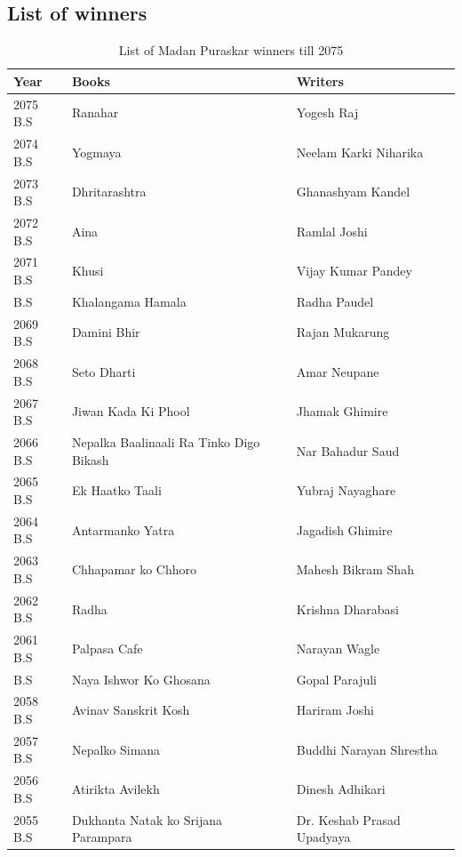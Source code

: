 \documentclass[
]{book}
\begin{document}
\hypertarget{list-of-winners}{%
\subsection{List of winners}\label{list-of-winners}}

\begingroup\fontsize{8}{10}\selectfont

\begin{longtable}[t]{l>{\raggedright\arraybackslash}p{14em}>{\raggedright\arraybackslash}p{24em}}
\caption{\label{tab:winners-list}List of Madan Puraskar winners till 2075}\\
\toprule
Year & Books & Writers\\
\midrule
\rowcolor{gray!6}  2075 B.S & Ranahar & Yogesh Raj\\
2074 B.S & Yogmaya & Neelam Karki Niharika\\
\rowcolor{gray!6}  2073 B.S & Dhritarashtra & Ghanashyam Kandel\\
2072 B.S & Aina & Ramlal Joshi\\
\rowcolor{gray!6}  2071 B.S & Khusi & Vijay Kumar Pandey\\
\addlinespace
2070 B.S & Khalangama Hamala & Radha Paudel\\
\rowcolor{gray!6}  2069 B.S & Damini Bhir & Rajan Mukarung\\
2068 B.S & Seto Dharti & Amar Neupane\\
\rowcolor{gray!6}  2067 B.S & Jiwan Kada Ki Phool & Jhamak Ghimire\\
2066 B.S & Nepalka Baalinaali Ra Tinko Digo Bikash & Nar Bahadur Saud\\
\addlinespace
\rowcolor{gray!6}  2065 B.S & Ek Haatko Taali & Yubraj Nayaghare\\
2064 B.S & Antarmanko Yatra & Jagadish Ghimire\\
\rowcolor{gray!6}  2063 B.S & Chhapamar ko Chhoro & Mahesh Bikram Shah\\
2062 B.S & Radha & Krishna Dharabasi\\
\rowcolor{gray!6}  2061 B.S & Palpasa Cafe & Narayan Wagle\\
\addlinespace
2060 B.S & Naya Ishwor Ko Ghosana & Gopal Parajuli\\
\rowcolor{gray!6}  2058 B.S & Avinav Sanskrit Kosh & Hariram Joshi\\
2057 B.S & Nepalko Simana & Buddhi Narayan Shrestha\\
\rowcolor{gray!6}  2056 B.S & Atirikta Avilekh & Dinesh Adhikari\\
2055 B.S & Dukhanta Natak ko Srijana Parampara & Dr. Keshab Prasad Upadyaya\\

\end{longtable}
\end{document}
